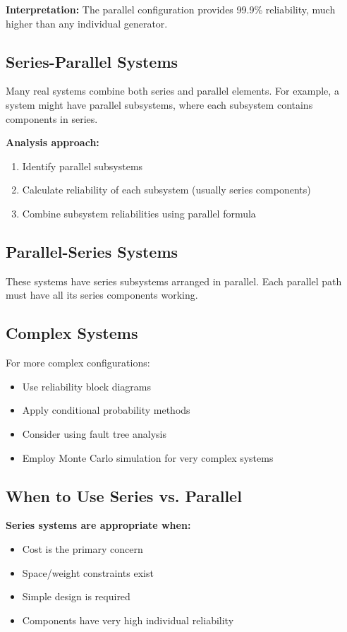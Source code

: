 \documentclass[twoside]{book}
\begin{document}
\textbf{Interpretation:} The parallel configuration provides 99.9\% reliability, much higher than any individual generator.

\subsection{Series-Parallel Systems}

Many real systems combine both series and parallel elements. For example, a system might have parallel subsystems, where each subsystem contains components in series.

\textbf{Analysis approach:}
\begin{enumerate}
    \item Identify parallel subsystems
    \item Calculate reliability of each subsystem (usually series components)
    \item Combine subsystem reliabilities using parallel formula
\end{enumerate}

\subsection{Parallel-Series Systems}

These systems have series subsystems arranged in parallel. Each parallel path must have all its series components working.

\subsection{Complex Systems}

For more complex configurations:
\begin{itemize}
    \item Use reliability block diagrams
    \item Apply conditional probability methods
    \item Consider using fault tree analysis
    \item Employ Monte Carlo simulation for very complex systems
\end{itemize}

\subsection{When to Use Series vs. Parallel}

\textbf{Series systems are appropriate when:}
\begin{itemize}
    \item Cost is the primary concern
    \item Space/weight constraints exist
    \item Simple design is required
    \item Components have very high individual reliability
\end{itemize}
\end{document}
